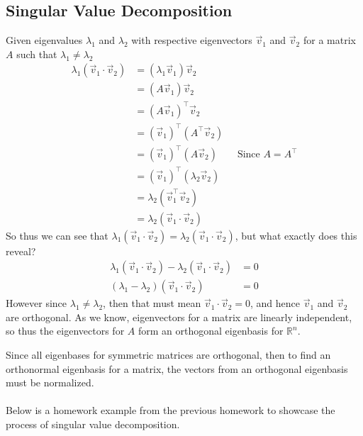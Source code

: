 \documentclass{report}
\begin{document}
\subsection{Singular Value Decomposition}
\begin{myproof} Given eigenvalues $\lambda_1$ and $\lambda_2$ with respective eigenvectors $\vec{v}_1$ and $\vec{v}_2$ for a matrix $A$ such that $\lambda_1 \ne \lambda_2$
$$
\begin{aligned}
\lambda_1(\vec{v}_1 \cdot \vec{v}_2) &= (\lambda_1\vec{v}_1)\vec{v}_2\\
&=(A\vec{v}_1)\vec{v}_2\\
&=(A\vec{v}_1)^\top\vec{v}_2\\
&=(\vec{v}_1)^\top(A^\top\vec{v}_2)\\
&=(\vec{v}_1)^\top(A\vec{v}_2) \qquad\text{Since } A = A^\top\\
&=(\vec{v}_1)^\top(\lambda_2\vec{v}_2)\\
&=\lambda_2(\vec{v}_1^\top\vec{v}_2)\\
&=\lambda_2(\vec{v}_1\cdot\vec{v}_2)
\end{aligned}
$$
So thus we can see that $\lambda_1(\vec{v}_1 \cdot \vec{v}_2)=\lambda_2(\vec{v}_1\cdot\vec{v}_2)$, but what exactly does this reveal?
$$
\begin{aligned}
\lambda_1(\vec{v}_1 \cdot \vec{v}_2)-\lambda_2(\vec{v}_1\cdot\vec{v}_2)&=0\\
(\lambda_1-\lambda_2)(\vec{v}_1\cdot\vec{v}_2)&=0
\end{aligned}
$$
However since $\lambda_1 \ne \lambda_2$, then that must mean $\vec{v}_1\cdot\vec{v}_2 = 0$, and hence $\vec{v}_1$ and $\vec{v}_2$ are orthogonal. As we know, eigenvectors for a matrix are linearly independent, so thus the eigenvectors for $A$ form an orthogonal eigenbasis for $\mathbb{R}^n$.
\end{myproof}
\noindent Since all eigenbases for symmetric matrices are orthogonal, then to find an orthonormal eigenbasis for a matrix, the vectors from an orthogonal eigenbasis must be normalized. \\
\\
\noindent Below is a homework example from the previous homework to showcase the process of singular value decomposition.
\end{document}

